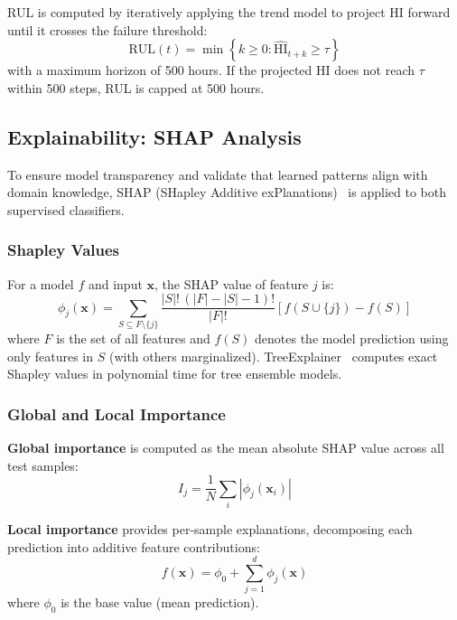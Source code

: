 \documentclass[preprint,12pt]{elsarticle}
\begin{document}
RUL is computed by iteratively applying the trend model to project HI forward until it crosses the failure threshold:
\begin{equation}
    \mathrm{RUL}(t) = \min\left\{k \geq 0 : \widehat{\mathrm{HI}}_{t+k} \geq \tau\right\}
\end{equation}
with a maximum horizon of 500 hours. If the projected HI does not reach $\tau$ within 500 steps, RUL is capped at 500 hours.

\subsection{Explainability: SHAP Analysis}
\label{sec:shap}

To ensure model transparency and validate that learned patterns align with domain knowledge, SHAP (SHapley Additive exPlanations)~\cite{lundberg2017} is applied to both supervised classifiers.

\subsubsection{Shapley Values}

For a model $f$ and input $\mathbf{x}$, the SHAP value of feature $j$ is:
\begin{equation}
    \phi_j(\mathbf{x}) = \sum_{S \subseteq F \setminus \{j\}} \frac{|S|! \, (|F|-|S|-1)!}{|F|!} \left[ f(S \cup \{j\}) - f(S) \right]
\end{equation}
where $F$ is the set of all features and $f(S)$ denotes the model prediction using only features in $S$ (with others marginalized). TreeExplainer~\cite{lundberg2020} computes exact Shapley values in polynomial time for tree ensemble models.

\subsubsection{Global and Local Importance}

\textbf{Global importance} is computed as the mean absolute SHAP value across all test samples:
\begin{equation}
    I_j = \frac{1}{N} \sum_i |\phi_j(\mathbf{x}_i)|
\end{equation}

\textbf{Local importance} provides per-sample explanations, decomposing each prediction into additive feature contributions:
\begin{equation}
    f(\mathbf{x}) = \phi_0 + \sum_{j=1}^{d} \phi_j(\mathbf{x})
\end{equation}
where $\phi_0$ is the base value (mean prediction).
\end{document}
